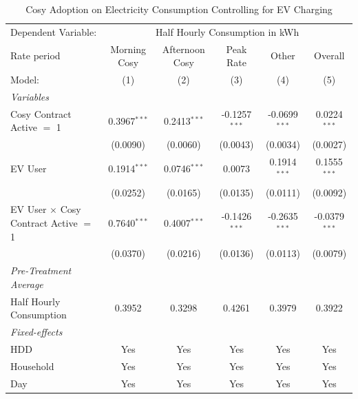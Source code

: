 
\begin{table}[htbp]
   \caption{\label{tab:cosy-did-ev} Cosy Adoption on Electricity Consumption Controlling for EV Charging}
   \centering
   \begin{tabular}{lccccc}
      \tabularnewline \midrule \midrule
      Dependent Variable: & \multicolumn{5}{c}{Half Hourly Consumption in kWh}\\
      Rate period                                  & Morning Cosy   & Afternoon Cosy & Peak Rate       & Other           & Overall \\   
      Model:                                       & (1)            & (2)            & (3)             & (4)             & (5)\\  
      \midrule
      \emph{Variables}\\
      Cosy Contract Active $=$ 1                   & 0.3967$^{***}$ & 0.2413$^{***}$ & -0.1257$^{***}$ & -0.0699$^{***}$ & 0.0224$^{***}$\\   
                                                   & (0.0090)       & (0.0060)       & (0.0043)        & (0.0034)        & (0.0027)\\   
      EV User                                      & 0.1914$^{***}$ & 0.0746$^{***}$ & 0.0073          & 0.1914$^{***}$  & 0.1555$^{***}$\\   
                                                   & (0.0252)       & (0.0165)       & (0.0135)        & (0.0111)        & (0.0092)\\   
      EV User $\times$ Cosy Contract Active $=$ 1  & 0.7640$^{***}$ & 0.4007$^{***}$ & -0.1426$^{***}$ & -0.2635$^{***}$ & -0.0379$^{***}$\\   
                                                   & (0.0370)       & (0.0216)       & (0.0136)        & (0.0113)        & (0.0079)\\   
\midrule
\emph{Pre-Treatment Average}\\
      Half Hourly Consumption                      & 0.3952         & 0.3298         & 0.4261          & 0.3979          & 0.3922\\  
      \midrule
      \emph{Fixed-effects}\\
      HDD                                          & Yes            & Yes            & Yes             & Yes             & Yes\\  
      Household                                    & Yes            & Yes            & Yes             & Yes             & Yes\\  
      Day                                          & Yes            & Yes            & Yes             & Yes             & Yes\\  

\end{tabular}
\end{table}
